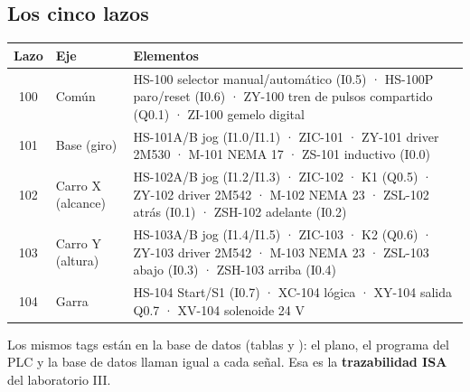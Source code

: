 \documentclass[11pt]{article}
\begin{document}
\subsection{Los cinco lazos}
\begin{center}\small
\begin{tabularx}{\linewidth}{c >{\raggedright}p{2.3cm} >{\raggedright\arraybackslash}X}
\toprule \textbf{Lazo} & \textbf{Eje} & \textbf{Elementos}\\ \midrule
100 & Común & HS-100 selector manual/automático (I0.5) · HS-100P paro/reset (I0.6) · ZY-100 tren de pulsos compartido (Q0.1) · ZI-100 gemelo digital\\
101 & Base (giro) & HS-101A/B jog (I1.0/I1.1) · ZIC-101 · ZY-101 driver 2M530 · M-101 NEMA 17 · ZS-101 inductivo (I0.0)\\
102 & Carro X (alcance) & HS-102A/B jog (I1.2/I1.3) · ZIC-102 · K1 (Q0.5) · ZY-102 driver 2M542 · M-102 NEMA 23 · ZSL-102 atrás (I0.1) · ZSH-102 adelante (I0.2)\\
103 & Carro Y (altura) & HS-103A/B jog (I1.4/I1.5) · ZIC-103 · K2 (Q0.6) · ZY-103 driver 2M542 · M-103 NEMA 23 · ZSL-103 abajo (I0.3) · ZSH-103 arriba (I0.4)\\
104 & Garra & HS-104 Start/S1 (I0.7) · XC-104 lógica · XY-104 salida Q0.7 · XV-104 solenoide 24 V\\
\bottomrule\end{tabularx}\end{center}
Los mismos tags están en la base de datos (tablas  y ): el plano, el programa del PLC y la base de datos llaman igual a cada señal. Esa es la \textbf{trazabilidad ISA} del laboratorio III.
\end{document}
